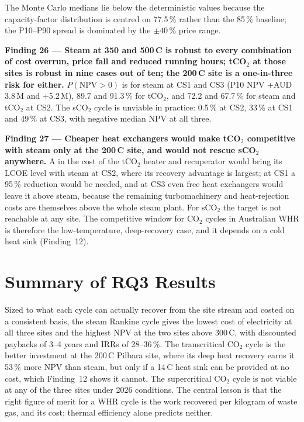 The Monte Carlo medians lie below the deterministic values because the
capacity-factor distribution is centred on 77.5\,\% rather than the 85\,\%
baseline; the P10--P90 spread is dominated by the $\pm 40$\,\% price range.

\begin{findingbox}
\textbf{Finding 26 --- Steam at 350 and 500\,\textdegree C is robust to every
combination of cost overrun, price fall and reduced running hours; tCO$_2$
at those sites is robust in nine cases out of ten; the 200\,\textdegree C
site is a one-in-three risk for either.}
$P(\mathrm{NPV}>0)$ is  for steam at CS1 and CS3
(P10 NPV +AUD\,3.8\,M and +5.2\,M), 89.7 and 91.3\,\% for tCO$_2$, and 72.2
and 67.7\,\% for steam and tCO$_2$ at CS2. The sCO$_2$ cycle is unviable in
practice: 0.5\,\% at CS2, 33\,\% at CS1 and 49\,\% at CS3, with negative
median NPV at all three.
\end{findingbox}

\begin{findingbox}
\textbf{Finding 27 --- Cheaper heat exchangers would make tCO$_2$ competitive
with steam only at the 200\,\textdegree C site, and would not rescue sCO$_2$
anywhere.}
A  in the cost of the tCO$_2$ heater and
recuperator would bring its LCOE level with steam at CS2, where its recovery
advantage is largest; at CS1 a 95\,\% reduction would be needed, and at CS3
even free heat exchangers would leave it above steam, because the remaining
turbomachinery and heat-rejection costs are themselves above the whole steam
plant. For sCO$_2$ the target is not reachable at any site. The competitive
window for CO$_2$ cycles in Australian WHR is therefore the low-temperature,
deep-recovery case, and it depends on a cold heat sink (Finding~12).
\end{findingbox}

\section{Summary of RQ3 Results}
\label{sec:rq3_summary}

Sized to what each cycle can actually recover from the site stream and
costed on a consistent basis, the steam Rankine cycle gives the lowest cost
of electricity at all three sites and the highest NPV at the two sites above
300\,\textdegree C, with discounted paybacks of 3--4 years and IRRs of
28--36\,\%. The transcritical CO$_2$ cycle is the better investment at the
200\,\textdegree C Pilbara site, where its deep heat recovery earns it 53\,\%
more NPV than steam, but only if a 14\,\textdegree C heat sink can be
provided at no cost, which Finding~12 shows it cannot. The supercritical
CO$_2$ cycle is not viable at any of the three sites under 2026 conditions.
The central lesson is that the right figure of merit for a WHR cycle is the
work recovered per kilogram of waste gas, and its cost; thermal efficiency
alone predicts neither.
